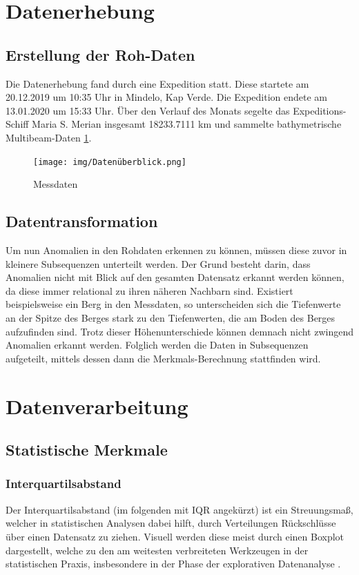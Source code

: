 \section{Datenerhebung}
\subsection{Erstellung der Roh-Daten}
Die Datenerhebung fand durch eine Expedition statt. Diese startete am 20.12.2019 um 10:35 Uhr in Mindelo, Kap Verde. Die Expedition endete am 13.01.2020 um 15:33 Uhr. Über den Verlauf des Monats segelte das Expeditions-Schiff Maria S. Merian insgesamt 18233.7111 km und sammelte bathymetrische Multibeam-Daten \ref{fig:datenüberblick}.

\begin{figure}[h!]
	\texttt{[image: img/Datenüberblick.png]}
	\caption[Gemessene Daten - Überblick]{Messdaten}
	\label{fig:datenüberblick}
\end{figure}

\subsection{Datentransformation}
Um nun Anomalien in den Rohdaten erkennen zu können, müssen diese zuvor in kleinere Subsequenzen unterteilt werden. Der Grund besteht darin, dass Anomalien nicht mit Blick auf den gesamten Datensatz erkannt werden können, da diese immer relational zu ihren näheren Nachbarn sind. Existiert beispielsweise ein Berg in den Messdaten, so unterscheiden sich die Tiefenwerte an der Spitze des Berges stark zu den Tiefenwerten, die am Boden des Berges aufzufinden sind. Trotz dieser Höhenunterschiede können demnach nicht zwingend Anomalien erkannt werden. \newline
Folglich werden die Daten in Subsequenzen aufgeteilt, mittels dessen dann die Merkmals-Berechnung stattfinden wird.


\section{Datenverarbeitung}
\subsection{Statistische Merkmale}
\subsubsection{Interquartilsabstand}
Der Interquartilsabstand (im folgenden mit IQR angekürzt) ist ein Streuungsmaß, welcher in statistischen Analysen dabei hilft, durch Verteilungen Rückschlüsse über einen Datensatz zu ziehen. Visuell werden diese meist durch einen Boxplot dargestellt, welche zu den am weitesten verbreiteten Werkzeugen in der statistischen Praxis, insbesondere in der Phase der explorativen Datenanalyse \cite{dovoedoBoxplotBasedOutlierDetection2015}.
